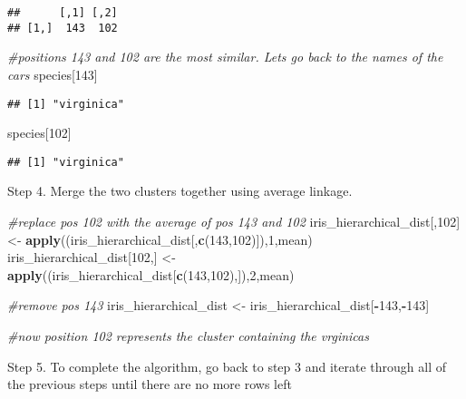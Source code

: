 \documentclass[11pt,]{article}
\newenvironment{Shaded}{\begin{snugshade}}{\end{snugshade}}
\newcommand{\CommentTok}[1]{\textcolor[rgb]{0.56,0.35,0.01}{\textit{#1}}}
\newcommand{\DecValTok}[1]{\textcolor[rgb]{0.00,0.00,0.81}{#1}}
\newcommand{\KeywordTok}[1]{\textcolor[rgb]{0.13,0.29,0.53}{\textbf{#1}}}
\newcommand{\NormalTok}[1]{#1}
\newcommand{\OperatorTok}[1]{\textcolor[rgb]{0.81,0.36,0.00}{\textbf{#1}}}
\newcommand{\StringTok}[1]{\textcolor[rgb]{0.31,0.60,0.02}{#1}}
\begin{document}
\begin{verbatim}
##      [,1] [,2]
## [1,]  143  102
\end{verbatim}

\begin{Shaded}
\begin{Highlighting}[]
\CommentTok{#positions 143 and 102 are the most similar. Lets go back to the names of the cars}
\NormalTok{species[}\DecValTok{143}\NormalTok{]}
\end{Highlighting}
\end{Shaded}

\begin{verbatim}
## [1] "virginica"
\end{verbatim}

\begin{Shaded}
\begin{Highlighting}[]
\NormalTok{species[}\DecValTok{102}\NormalTok{]}
\end{Highlighting}
\end{Shaded}

\begin{verbatim}
## [1] "virginica"
\end{verbatim}

Step 4. Merge the two clusters together using average linkage.

\begin{Shaded}
\begin{Highlighting}[]
\CommentTok{#replace pos 102 with the average of pos 143 and 102}
\NormalTok{iris_hierarchical_dist[,}\DecValTok{102}\NormalTok{] <-}\StringTok{ }\KeywordTok{apply}\NormalTok{((iris_hierarchical_dist[,}\KeywordTok{c}\NormalTok{(}\DecValTok{143}\NormalTok{,}\DecValTok{102}\NormalTok{)]),}\DecValTok{1}\NormalTok{,mean)}
\NormalTok{iris_hierarchical_dist[}\DecValTok{102}\NormalTok{,] <-}\StringTok{ }\KeywordTok{apply}\NormalTok{((iris_hierarchical_dist[}\KeywordTok{c}\NormalTok{(}\DecValTok{143}\NormalTok{,}\DecValTok{102}\NormalTok{),]),}\DecValTok{2}\NormalTok{,mean)}

\CommentTok{#remove pos 143}
\NormalTok{iris_hierarchical_dist <-}\StringTok{ }\NormalTok{iris_hierarchical_dist[}\OperatorTok{-}\DecValTok{143}\NormalTok{,}\OperatorTok{-}\DecValTok{143}\NormalTok{]}

\CommentTok{#now position 102 represents the cluster containing the vrginicas}
\end{Highlighting}
\end{Shaded}

Step 5. To complete the algorithm, go back to step 3 and iterate through
all of the previous steps until there are no more rows left
\end{document}
